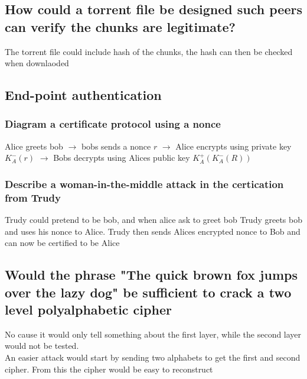 \documentclass[12pt, a4paper]{article}
\begin{document}
		\subsection{How could a torrent file be designed such peers can verify the chunks are legitimate?}
			The torrent file could include hash of the chunks, the hash can then be checked when downlaoded
		\subsection{End-point authentication}
			\subsubsection{Diagram a certificate protocol using a nonce}
				Alice greets bob $\rightarrow$ bobs sends a nonce $r$ $\rightarrow$ Alice encrypts using private key $K_A^-(r)$ $\rightarrow$ Bobs decrypts using Alices public key $K_A^+(K_A^-(R))$
			\subsubsection{Describe a woman-in-the-middle attack in the certication from Trudy}
				Trudy could pretend to be bob, and when alice ask to greet bob Trudy greets bob and uses his nonce to Alice. Trudy then sends Alices encrypted nonce to Bob and can now be certified to be Alice
		\subsection{Would the phrase "The quick brown fox jumps over the lazy dog" be sufficient to crack a two level polyalphabetic cipher}
			No cause it would only tell something about the first layer, while the second layer would not be tested.\\
			An easier attack would start by sending two alphabets to get the first and second cipher. From this the cipher would be easy to reconstruct
\end{document}
